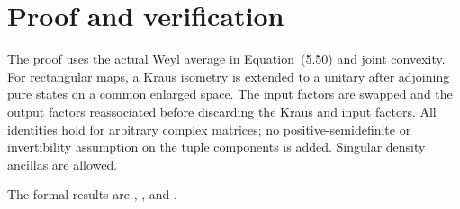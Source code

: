 \documentclass{article}
\begin{document}
\section{Proof and verification}

The proof uses the actual Weyl average in Equation~(5.50) and joint convexity.
For rectangular maps, a Kraus isometry is extended to a unitary after
adjoining pure states on a common enlarged space. The input factors are
swapped and the output factors reassociated before discarding the Kraus and
input factors. All identities hold for arbitrary complex matrices; no
positive-semidefinite or invertibility assumption on the tuple components
is added. Singular density ancillas are allowed.

The formal results are
,
, and
.



\end{document}

